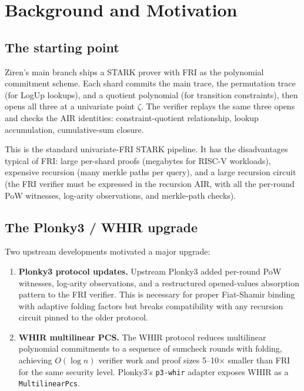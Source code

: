 \section{Background and Motivation}
\label{sec:background}

\subsection{The starting point}

Ziren's main branch ships a STARK prover with FRI as the polynomial
commitment scheme.  Each shard commits the main trace, the permutation
trace (for LogUp lookups), and a quotient polynomial (for transition
constraints), then opens all three at a univariate point $\zeta$.  The
verifier replays the same three opens and checks the AIR identities:
constraint-quotient relationship, lookup accumulation, cumulative-sum
closure.

This is the standard univariate-FRI STARK pipeline.  It has the
disadvantages typical of FRI: large per-shard proofs (megabytes for
RISC-V workloads), expensive recursion (many merkle paths per query),
and a large recursion circuit (the FRI verifier must be expressed in
the recursion AIR, with all the per-round PoW witnesses, log-arity
observations, and merkle-path checks).

\subsection{The Plonky3 / WHIR upgrade}

Two upstream developments motivated a major upgrade:

\begin{enumerate}
  \item \textbf{Plonky3 protocol updates.}  Upstream Plonky3 added
        per-round PoW witnesses, log-arity observations, and a
        restructured opened-values absorption pattern to the FRI
        verifier.  This is necessary for proper Fiat-Shamir binding
        with adaptive folding factors but breaks compatibility with
        any recursion circuit pinned to the older protocol.
  \item \textbf{WHIR multilinear PCS.}  The WHIR protocol
        \cite{whir2024} reduces multilinear polynomial commitments to
        a sequence of sumcheck rounds with folding, achieving
        $O(\log n)$ verifier work and proof sizes 5--10$\times$
        smaller than FRI for the same security level.  Plonky3's
        \texttt{p3-whir} adapter exposes WHIR as a
        \texttt{MultilinearPcs}.
\end{enumerate}

